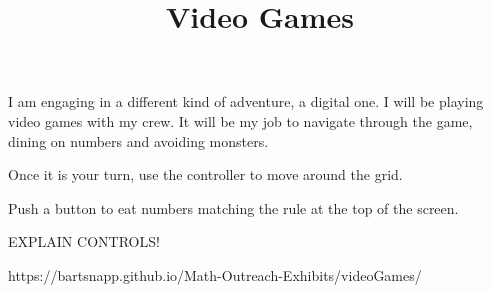 \documentclass{../exhibit}
\title{Video Games}
\begin{document}
\begin{context}
  I am engaging in a different kind of adventure, a digital one. I will be playing video games with my crew.
  It will be my job to navigate through the game, dining on numbers and avoiding monsters.
\end{context}

\begin{directions}
  Once it is your turn, 
  use the controller to move around the grid.

  Push a button to eat numbers matching the rule at the top of the
screen.
\end{directions}

\begin{example}

EXPLAIN CONTROLS!
\end{example}

\begin{mathConnections}
  https://bartsnapp.github.io/Math-Outreach-Exhibits/videoGames/
\end{mathConnections}
\end{document}
